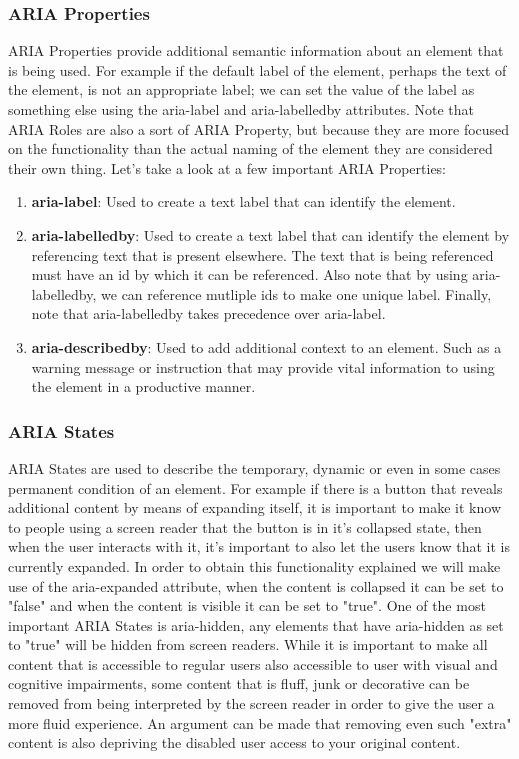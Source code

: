 \documentclass[11pt]{article}
\begin{document}
\subsubsection{ARIA Properties}
\label{sec:orgf06d760}
ARIA Properties provide additional semantic information about an element that is being used. For
example if the default label of the element, perhaps the text of the element, is not an appropriate
label; we can set the value of the label as something else using the aria-label and aria-labelledby
attributes. Note that ARIA Roles are also a sort of ARIA Property, but because they are more focused
on the functionality than the actual naming of the element they are considered their own
thing. Let's take a look at a few important ARIA Properties:
\begin{enumerate}
\item \textbf{aria-label}: Used to create a text label that can identify the element.
\item \textbf{aria-labelledby}: Used to create a text label that can identify the element by referencing text
that is present elsewhere. The text that is being referenced must have an id by which it can be
referenced. Also note that by using aria-labelledby, we can reference mutliple ids to make one
unique label. Finally, note that aria-labelledby takes precedence over aria-label.
\item \textbf{aria-describedby}: Used to add additional context to an element. Such as a warning message or
instruction that may provide vital information to using the element in a productive manner.
\end{enumerate}
\subsubsection{ARIA States}
\label{sec:org468dffa}
ARIA States are used to describe the temporary, dynamic or even in some cases permanent condition of an
element. For example if there is a button that reveals additional content by means of expanding
itself, it is important to make it know to people using a screen reader that the button is in it's
collapsed state, then when the user interacts with it, it's important to also let the users know
that it is currently expanded. In order to obtain this functionality explained we will make use of
the aria-expanded attribute, when the content is collapsed it can be set to "false" and when the
content is visible it can be set to "true".
One of the most important ARIA States is aria-hidden, any elements that have aria-hidden as set to
"true" will be hidden from screen readers. While it is important to make all content that is
accessible to regular users also accessible to user with visual and cognitive impairments, some
content that is fluff, junk or decorative can be removed from being interpreted by the screen reader
in order to give the user a more fluid experience.
An argument can be made that removing even such "extra" content is also depriving the disabled user
access to your original content.
\end{document}
